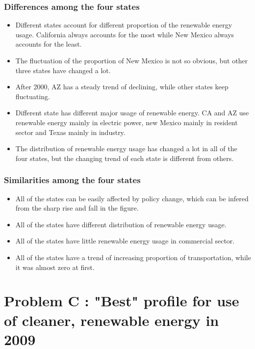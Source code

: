 \documentclass[a4paper,11pt]{article}
\begin{document}
\subsubsection{Differences among the four states}

\begin{itemize}
    \item Different states account for different proportion of the renewable energy usage. California always accounts for the most while New Mexico always accounts for the least.
    \item The fluctuation of the proportion of New Mexico is not so obvious, but other three states have changed a lot.
    \item After 2000, AZ has a steady trend of declining, while other states keep fluctuating.
    \item Different state has different major usage of renewable energy. CA and AZ use renewable energy mainly in electric power, new Mexico mainly in resident sector and Texas mainly in industry.
    \item The distribution of renewable energy usage has changed a lot in all of the four states, but the changing trend of each state is different from others.
\end{itemize}

\subsubsection{Similarities among the four states}

\begin{itemize}
    \item All of the states can be easily affected by policy change, which can be infered from the sharp rise and fall in the figure.
    \item All of the states have different distribution of renewable energy usage.
    \item All of the states have little renewable energy usage in commercial sector.
    \item All of the states have a trend of increasing proportion of transportation, while it was almost zero at first.
\end{itemize}


\section{Problem C : "Best" profile for use of cleaner, renewable energy in 2009}
\end{document}
